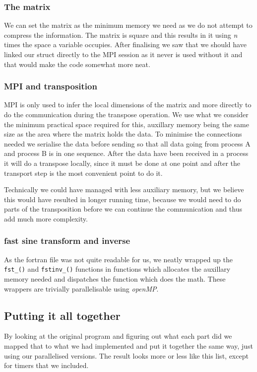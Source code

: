 \subsubsection{The matrix}
We can set the matrix as the minimum memory we need as we do not attempt to
compress the information. The matrix is square and this results in it using
\emph{n} times the space a variable occupies. After finalising we saw that we
should have linked our struct directly to the MPI session as it never is used
without it and that would make the code somewhat more neat. 

\subsubsection{MPI and transposition}
MPI is only used to infer the local dimensions of the matrix and more directly
to do the communication during the transpose operation. We use what we consider
the minimum practical space required for this, auxillary memory being the same
size as the area where the matrix holds the data. To minimise the connections
needed we serialise the data before sending so that all data going from process
A and process B is in one sequence. After the data have been received in a
process it will do a transpose locally, since it must be done at one point and
after the transport step is the most convenient point to do it. 

Technically we could have managed with less auxiliary memory, but we believe this
would have resulted in longer running time, because we would need to do parts
of the transposition before we can continue the communication and thus add much more
complexity. 

\subsubsection{fast sine transform and inverse }
As the fortran file was not quite readable for us, we neatly wrapped up the
\texttt{fst\_()} and \texttt{fstinv\_()} functions in functions which allocates the
auxillary memory needed and dispatches the function which does the math. These
wrappers are trivially parallelisable using \emph{openMP}. 

\subsection{Putting it all together} 
By looking at the original program and figuring out what each part did we
mapped that to what we had implemented and put it together the same way, just
using our parallelised versions. The result looks more or less like this list,
except for timers that we included. 


